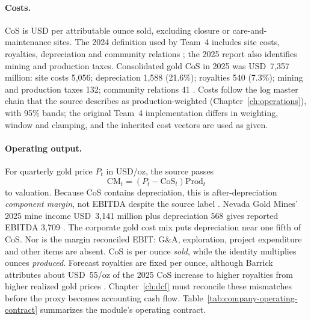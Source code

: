 \paragraph{Costs.}
CoS is USD per attributable ounce sold, excluding closure or care-and-maintenance
sites. The 2024 definition used by Team~4 includes site costs,
royalties, depreciation and community relations \cite{team4}; the 2025 report
also identifies mining and production taxes. Consolidated gold CoS in 2025
was USD~7,357 million: site costs 5,056; depreciation 1,588 (21.6\%);
royalties 540 (7.3\%); mining and production taxes 132; community relations
41 \cite{barrick-ar-2025}. Costs follow the log master chain that the source
describes as production-weighted (Chapter~\ref{ch:operations}), with 95\%
bands; the original Team~4 implementation differs in weighting, window and clamping, and the
inherited cost vectors are used as given.

\paragraph{Operating output.}
For quarterly gold price $P_t$ in USD/oz, the source passes
\begin{equation}
\mathrm{CM}_t=(P_t-\mathrm{CoS}_t)\mathrm{Prod}_t
\label{eq:company-component-margin}
\end{equation}
to valuation. Because CoS contains depreciation, this is after-depreciation
\emph{component margin}, not EBITDA despite the source label \cite{team4}.
Nevada Gold Mines' 2025 mine income USD~3,141 million plus depreciation 568
gives reported EBITDA 3,709 \cite{barrick-ar-2025}. The corporate gold cost
mix puts depreciation near one fifth of CoS. Nor is the margin reconciled
EBIT: G\&A, exploration, project expenditure and other items are absent.
CoS is per ounce \emph{sold}, while the identity multiplies ounces
\emph{produced}. Forecast royalties are fixed per ounce, although Barrick
attributes about USD~55/oz of the 2025 CoS increase to higher royalties from
higher realized gold prices \cite{barrick-ar-2025}. Chapter~\ref{ch:dcf} must reconcile
these mismatches before the proxy becomes accounting cash flow.
Table~\ref{tab:company-operating-contract} summarizes the module's operating
contract.

